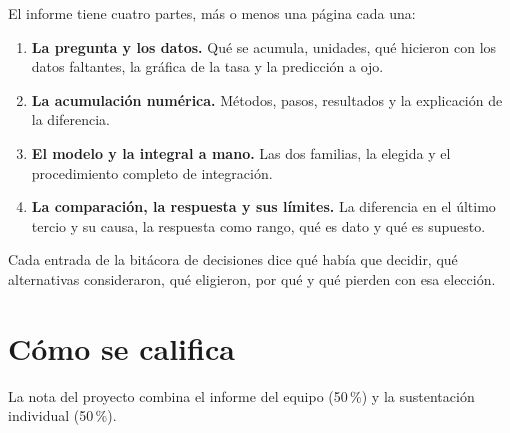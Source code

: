\documentclass[12pt,letterpaper]{article}
\newcommand{\pesoInforme}{50\,\%}
\newcommand{\pesoSustentacion}{50\,\%}
\begin{document}
El informe tiene cuatro partes, más o menos una página cada una:
\begin{enumerate}[label=\arabic*.,itemsep=0.1em]
    \item \textbf{La pregunta y los datos.} Qué se acumula, unidades, qué hicieron con los datos faltantes, la gráfica de la tasa y la predicción a ojo.
    \item \textbf{La acumulación numérica.} Métodos, pasos, resultados y la explicación de la diferencia.
    \item \textbf{El modelo y la integral a mano.} Las dos familias, la elegida y el procedimiento completo de integración.
    \item \textbf{La comparación, la respuesta y sus límites.} La diferencia en el último tercio y su causa, la respuesta como rango, qué es dato y qué es supuesto.
\end{enumerate}
Cada entrada de la bitácora de decisiones dice qué había que decidir, qué alternativas consideraron, qué eligieron, por qué y qué pierden con esa elección.

\section{Cómo se califica}
La nota del proyecto combina el informe del equipo (\pesoInforme) y la sustentación individual (\pesoSustentacion).
\end{document}
